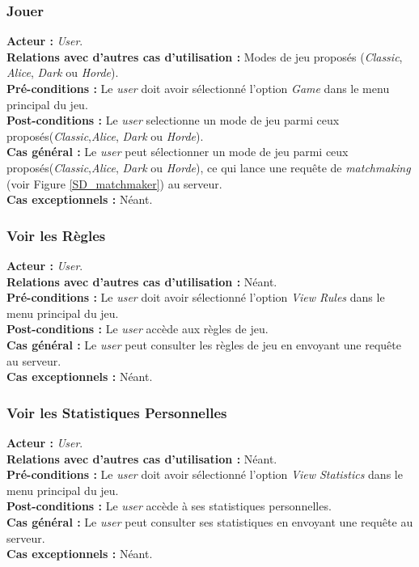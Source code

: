 \documentclass[10pt, a4paper]{article}
\begin{document}
\subsubsection{Jouer}
\textbf{Acteur :} \textit{User}.\\
\textbf{Relations avec d'autres cas d'utilisation :} Modes de jeu proposés (\textit{Classic}, \textit{Alice}, \textit{Dark} ou \textit{Horde}).\\
\textbf{Pré-conditions :} Le \textit{user} doit avoir sélectionné l'option \textit{Game} dans le menu principal du jeu.\\
\textbf{Post-conditions :} Le  \textit{user} selectionne un mode de jeu parmi ceux proposés(\textit{Classic},\textit{Alice}, \textit{Dark} ou \textit{Horde}).\\
\textbf{Cas général :} Le  \textit{user} peut sélectionner un mode de jeu parmi ceux proposés(\textit{Classic},\textit{Alice}, \textit{Dark} ou \textit{Horde}), ce qui lance une requête de \textit{matchmaking} (voir Figure \ref{SD_matchmaker}) au serveur.\\
\textbf{Cas exceptionnels :} Néant.



\subsubsection{Voir les Règles}
\textbf{Acteur :} \textit{User}.\\
\textbf{Relations avec d'autres cas d'utilisation :} Néant.\\
\textbf{Pré-conditions :} Le \textit{user} doit avoir sélectionné l'option \textit{View Rules} dans le menu principal du jeu.\\
\textbf{Post-conditions :} Le \textit{user} accède aux règles de jeu.\\
\textbf{Cas général :} Le \textit{user} peut consulter les règles de jeu en envoyant une requête au serveur.\\
\textbf{Cas exceptionnels :} Néant.

\subsubsection{Voir les Statistiques Personnelles}
\textbf{Acteur :} \textit{User}.\\
\textbf{Relations avec d'autres cas d'utilisation :} Néant.\\
\textbf{Pré-conditions :} Le \textit{user} doit avoir sélectionné l'option \textit{View Statistics} dans le menu principal du jeu.\\
\textbf{Post-conditions :} Le \textit{user} accède à ses statistiques personnelles.\\
\textbf{Cas général :} Le \textit{user} peut consulter ses statistiques en envoyant une requête au serveur.\\
\textbf{Cas exceptionnels :} Néant.
\end{document}
